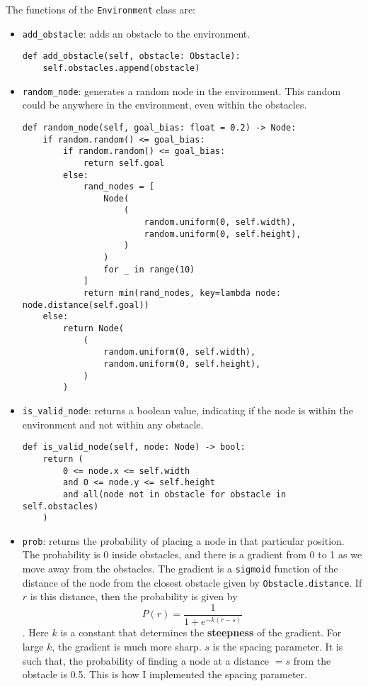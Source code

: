 \documentclass[12pt]{report}
\begin{document}
The functions of the \texttt{Environment} class are:
\begin{itemize}
    \item \texttt{add\_obstacle}: adds an obstacle to the environment.
          \begin{lstlisting}[caption={\texttt{Environment.add\_obstacle}}]
def add_obstacle(self, obstacle: Obstacle):
    self.obstacles.append(obstacle)
        \end{lstlisting}
    \item \texttt{random\_node}: generates a random node in the environment. This random could be anywhere in the environment, even within the obstacles.
          \begin{lstlisting}[caption={\texttt{Environment.random\_node}}]
def random_node(self, goal_bias: float = 0.2) -> Node:
    if random.random() <= goal_bias:
        if random.random() <= goal_bias:
            return self.goal
        else:
            rand_nodes = [
                Node(
                    (
                        random.uniform(0, self.width),
                        random.uniform(0, self.height),
                    )
                )
                for _ in range(10)
            ]
            return min(rand_nodes, key=lambda node: node.distance(self.goal))
    else:
        return Node(
            (
                random.uniform(0, self.width),
                random.uniform(0, self.height),
            )
        )    
        \end{lstlisting}
    \item \texttt{is\_valid\_node}: returns a boolean value, indicating if the node is within the environment and not within any obstacle.
          \begin{lstlisting}[caption={\texttt{Environment.is\_valid\_node}}]
def is_valid_node(self, node: Node) -> bool:
    return (
        0 <= node.x <= self.width
        and 0 <= node.y <= self.height
        and all(node not in obstacle for obstacle in self.obstacles)
    )
        \end{lstlisting}
    \item \texttt{prob}: returns the probability of placing a node in that particular position. The probability is 0 inside obstacles, and there is a gradient from 0 to 1 as we move away from the obstacles. The gradient is a \texttt{sigmoid} function of the distance of the node from the closest obstacle given by \texttt{Obstacle.distance}. If $r$ is this distance, then the probability is given by $$P(r) = \frac{1}{1 + e^{-k(r - s)}}$$. Here $k$ is a constant that determines the \textbf{steepness} of the gradient. For large $k$, the gradient is much more sharp. $s$ is the spacing parameter. It is such that, the probability of finding a node at a distance $= s$ from the obstacle is 0.5. This is how I implemented the spacing parameter.

\end{itemize}
\end{document}

